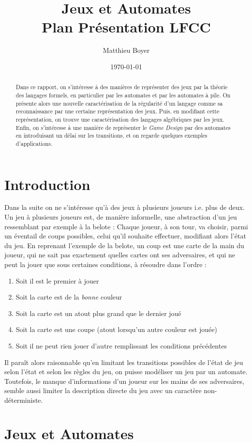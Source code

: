 \documentclass{cours}
\title{Jeux et Automates\\ \small Plan Présentation LFCC}
\author{Matthieu Boyer}
\date{\today}
\begin{document}
\begin{abstract}
    Dans ce rapport, on s'intéresse à des manières de représenter des jeux par la théorie des langages formels, en particulier par les automates et par les automates à pile. On présente alors une nouvelle caractérisation de la régularité d'un langage comme sa reconnaissance par une certaine représentation des jeux. Puis, en modifiant cette représentation, on trouve une caractérisation des langages algébriques par les jeux. Enfin, on s'intéresse à une manière de représenter le \textit{Game Design} par des automates en introduisant un délai sur les transitions, et on regarde quelques exemples d'applications.
\end{abstract}
\section*{Introduction}
Dans la suite on ne s'intéresse qu'à des jeux à plusieurs joueurs i.e. plus de deux.\\ Un jeu à plusieurs joueurs est, de manière informelle, une abstraction d'un jeu ressemblant par exemple à la belote : Chaque joueur, à son tour, va choisir, parmi un éventail de coups possibles, celui qu'il souhaite effectuer, modifiant alors l'état du jeu. En reprenant l'exemple de la belote, un coup est une carte de la main du joueur, qui ne sait pas exactement quelles cartes ont ses adversaires, et qui ne peut la jouer que sous certaines conditions, à résoudre dans l'ordre :
\begin{enumerate}
    \item Soit il est le premier à jouer
    \item Soit la carte est de la \textit{bonne} couleur
    \item Soit la carte est un atout plus grand que le dernier joué
    \item Soit la carte est une coupe (atout lorsqu'un autre couleur est jouée)
    \item Soit il ne peut rien jouer d'autre remplissant les conditions précédentes
\end{enumerate}
Il paraît alors raisonnable qu'en limitant les transitions possibles de l'état de jeu selon l'état et selon les règles du jeu, on puisse modéliser un jeu par un automate. Toutefois, le manque d'informations d'un joueur sur les mains de ses adversaires, semble aussi limiter la description directe du jeu avec un caractère non-déterministe.

\section{Jeux et Automates}
\end{document}
